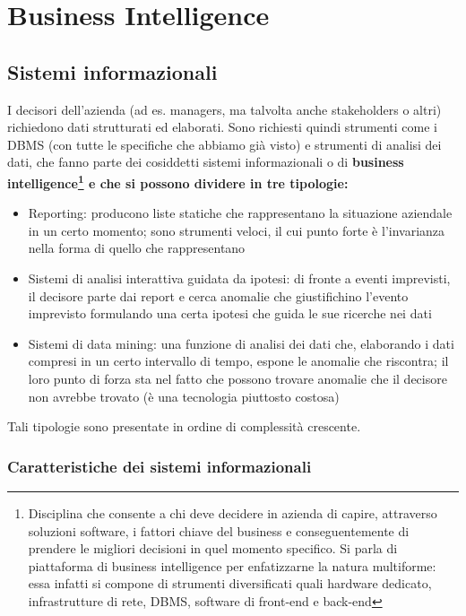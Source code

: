 \chapter{Business Intelligence}

\section{Sistemi informazionali}
\label{sec:Sistemi informazionali}
I decisori dell'azienda (ad es. managers, ma talvolta anche stakeholders o altri) richiedono dati strutturati ed elaborati.
Sono richiesti quindi strumenti come i DBMS (con tutte le specifiche che abbiamo gi\`a visto) e strumenti di analisi dei dati, che fanno parte dei cosiddetti sistemi informazionali o di \bf business intelligence\rm\footnote{Disciplina che consente a chi deve decidere in azienda di capire, attraverso soluzioni software, i fattori chiave del business e conseguentemente di prendere le migliori decisioni in quel momento specifico. Si parla di piattaforma di business intelligence per enfatizzarne la natura multiforme: essa infatti si compone di strumenti diversificati quali hardware dedicato, infrastrutture di rete, DBMS, software di front-end e back-end} e che si possono dividere in tre tipologie:
\begin{itemize}
  \item Reporting: producono liste statiche che rappresentano la situazione aziendale in un certo momento; sono strumenti veloci, il cui punto forte \`e l'invarianza nella forma di quello che rappresentano
  \item Sistemi di analisi interattiva guidata da ipotesi: di fronte a eventi imprevisti, il decisore parte dai report
  e cerca anomalie che giustifichino l'evento imprevisto formulando una certa ipotesi che guida
  le sue ricerche nei dati
  \item Sistemi di data mining: una funzione di analisi dei dati che, elaborando i dati compresi in un certo intervallo di tempo, espone le anomalie che riscontra; il loro punto di forza sta nel fatto che possono trovare anomalie che il decisore non avrebbe trovato (\`e una tecnologia piuttosto costosa)
\end{itemize}
Tali tipologie sono presentate in ordine di complessit\`a crescente.\\


\subsection{Caratteristiche dei sistemi informazionali}
\label{sub:Caratteristiche dei sistemi informazionali}
